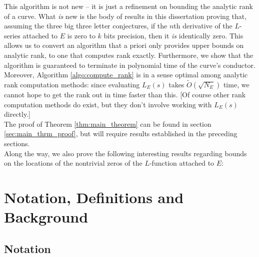 \documentclass[10pt]{article}
\newcommand{\Les}{L_E(s)}
\begin{document}
This algorithm is not new -- it is just a refinement on bounding the analytic rank of a curve. What {\it is} new is the body of results in this dissertation proving that, assuming the three big three letter conjectures, if the $n$th derivative of the $L$-series attached to $E$ is zero to $k$ bits precision, then it {\it is} identically zero. This allows us to convert an algorithm that a priori only provides upper bounds on analytic rank, to one that computes rank exactly. Furthermore, we show that the algorithm is guaranteed to terminate in polynomial time of the curve's conductor. \\

Moreover, Algorithm \ref{algo:compute_rank} is in a sense optimal among analytic rank computation methods: since evaluating $\Les$ takes $\tilde{O}(\sqrt{N_E})$ time, we cannot hope to get the rank out in time faster than this. [Of course other rank computation methods do exist, but they don't involve working with $\Les$ directly.] \\

The proof of Theorem \ref{thm:main_theorem} can be found in section \ref{sec:main_thrm_proof}, but will require results established in the preceding sections. \\

Along the way, we also prove the following interesting results regarding bounds on the locations of the nontrivial zeros of the $L$-function attached to $E$:


\newpage
\section{Notation, Definitions and Background}\label{sec:defs_background}

\subsection{Notation}\label{subsec:notation}
\end{document}
